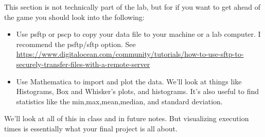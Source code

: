 \documentclass[]{tufte-handout}
\begin{document}
This section is not technically part of the lab, but for if you want to get ahead of the game you should look into the following:
\begin{itemize}
\item Use psftp or pscp to copy your data file to your machine or a lab computer. I recommend the psftp/sftp option. 
\newline
See \url{https://www.digitalocean.com/community/tutorials/how-to-use-sftp-to-securely-transfer-files-with-a-remote-server}
\item Use Mathematica to import and plot the data.  We'll look at things like Histograms, Box and Whisker's plots, and histograms. It's also useful to find statistics like the min,max,mean,median, and standard deviation.  
\end{itemize}
We'll look at all of this in class and in future notes. But visualizing execution times is essentially what your final project is all about. 
\end{document}
